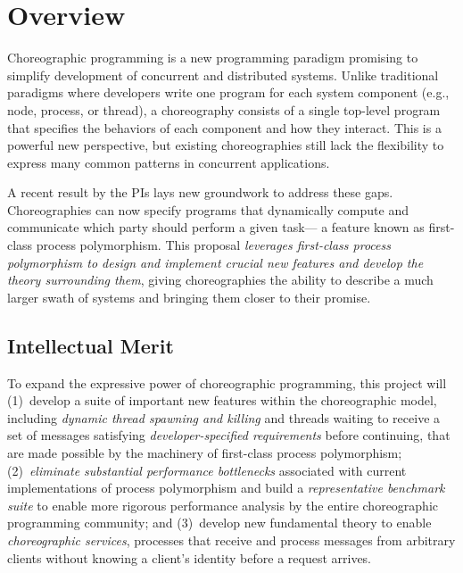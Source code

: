 



\section*{Overview}

Choreographic programming is a new programming paradigm promising to simplify development of concurrent and distributed systems.
Unlike traditional paradigms where developers write one program for each system component (e.g., node, process, or thread),
a choreography consists of a single top-level program that specifies the behaviors of each component and how they interact.
This is a powerful new perspective, but existing choreographies still lack the flexibility to express many common patterns in concurrent applications.

A recent result by the PIs lays new groundwork to address these gaps.
Choreographies can now specify programs that dynamically compute and communicate which party should perform a given task---%
a feature known as first-class process polymorphism.
This proposal \emph{leverages first-class process polymorphism to design and implement crucial new features and develop the theory surrounding them},
giving choreographies the ability to describe a much larger swath of systems and bringing them closer to their promise.

\subsection*{Intellectual Merit}

To expand the expressive power of choreographic programming, this project will
(1)~develop a suite of important new features within the choreographic model,
including \emph{dynamic thread spawning and killing}
and threads waiting to receive a set of messages satisfying \emph{developer-specified requirements} before continuing,
that are made possible by the machinery of first-class process polymorphism;
(2)~\emph{eliminate substantial performance bottlenecks} associated with current implementations of process polymorphism
and build a \emph{representative benchmark suite} to enable more rigorous performance analysis by the entire choreographic programming community;
and (3)~develop new fundamental theory to enable \emph{choreographic services},
processes that receive and process messages from arbitrary clients without knowing a client's identity before a request arrives.

